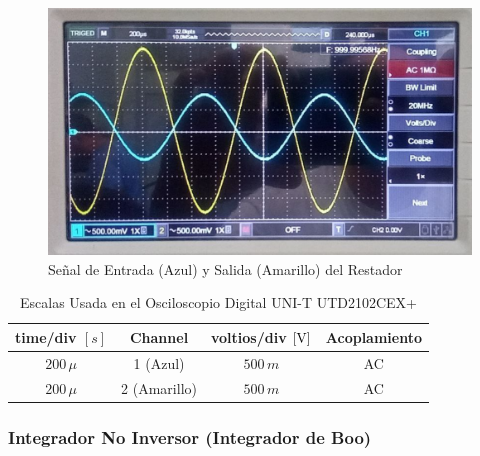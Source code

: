         
        \begin{figure}[H]
            \centering
            \renewcommand{\figurename}{Imagen}
            \includegraphics[width=15cm]{Imagenes/exp_restador.png}
            \caption{Señal de Entrada (Azul) y Salida (Amarillo) del Restador}
            \label{fig:exp_restador}
        \end{figure}
    
        \begin{table}[H]
            \centering
            \begin{tabular}{|c|c|c|c|}
                \hline
                \textbf{time/div} $[s]$ & \textbf{Channel} & \textbf{voltios/div $[\volt]$} & \textbf{Acoplamiento} \\ \hline
                $200 \, \mu$ & 1 (Azul) &  $500 \, m $ & AC \\ \hline
                $200 \, \mu$ & 2 (Amarillo)  &   $500 \, m $ & AC \\ \hline  
            \end{tabular}
            \caption{Escalas Usada en el Osciloscopio Digital UNI-T UTD2102CEX+}
            \label{tab:escala_restador}
        \end{table}

    \subsubsection{Integrador No Inversor (Integrador de Boo)}

